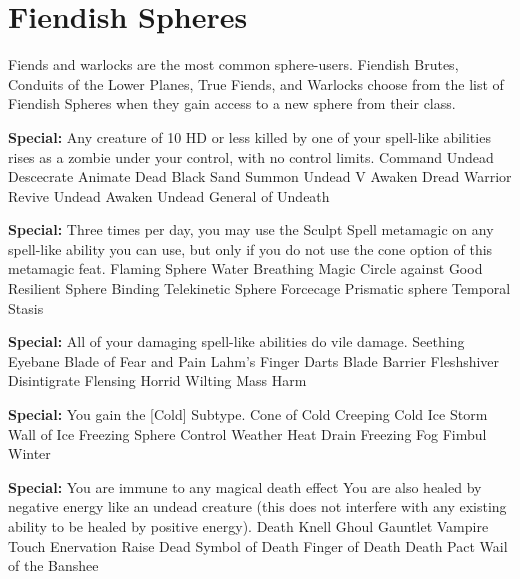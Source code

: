 \section{Fiendish Spheres}

Fiends and warlocks are the most common sphere-users.  Fiendish Brutes, Conduits of the Lower Planes, True Fiends, and Warlocks choose from the list of Fiendish Spheres when they gain access to a new sphere from their class.

\begin{multicols}{2}

\textbf{Special: }{Any creature of 10 HD or less killed by one of your spell-like abilities rises as a zombie under your control, with no control limits.}
\sphere
{Command Undead}
{Descecrate}
{Animate Dead}
{Black Sand}
{Summon Undead V}
{Awaken Dread Warrior}
{Revive Undead}
{Awaken Undead}
{General of Undeath}

\textbf{Special: }{Three times per day, you may use the Sculpt Spell metamagic on any spell-like ability you can use, but only if you do not use the cone option of this metamagic feat.}
\sphere
{Flaming Sphere}
{Water Breathing}
{Magic Circle against Good}
{Resilient Sphere}
{Binding}
{Telekinetic Sphere}
{Forcecage}
{Prismatic sphere}
{Temporal Stasis}

\textbf{Special: }{All of your damaging spell-like abilities do vile damage.}
\sphere
{Seething Eyebane}
{Blade of Fear and Pain}
{Lahm's Finger Darts}
{Blade Barrier}
{Fleshshiver}
{Disintigrate}
{Flensing}
{Horrid Wilting}
{Mass Harm}

\textbf{Special: }{You gain the [Cold] Subtype.}
\sphere
{Cone of Cold}
{Creeping Cold}
{Ice Storm}
{Wall of Ice}
{Freezing Sphere}
{Control Weather}
{Heat Drain}
{Freezing Fog}
{Fimbul Winter}

\textbf{Special: }{You are immune to any magical death effect You are also healed by negative energy like an undead creature (this does not interfere with any existing ability to be healed by positive energy).}
\sphere
{Death Knell}
{Ghoul Gauntlet}
{Vampire Touch}
{Enervation}
{Raise Dead}
{Symbol of Death}
{Finger of Death}
{Death Pact}
{Wail of the Banshee}


\end{multicols}
